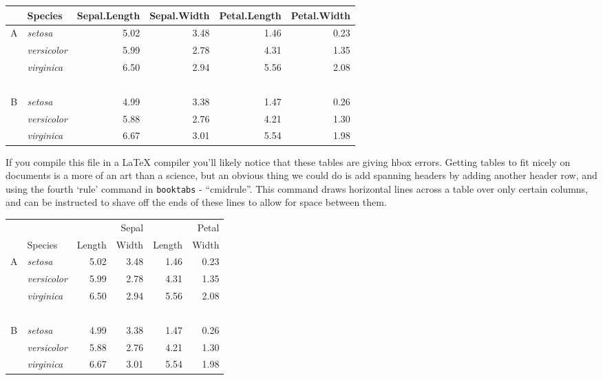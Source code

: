 \documentclass{article}
\begin{document}
\begin{table}[h!]
\centering
\begin{tabular}{clrrrr}
  \toprule
  & Species & Sepal.Length & Sepal.Width & Petal.Length & Petal.Width \\ 
  \midrule
  A & \emph{setosa} & 5.02 & 3.48 & 1.46 & 0.23 \\ 
    & \emph{versicolor} & 5.99 & 2.78 & 4.31 & 1.35 \\ 
    & \emph{virginica} & 6.50 & 2.94 & 5.56 & 2.08 \\ ~\\
  B & \emph{setosa} & 4.99 & 3.38 & 1.47 & 0.26 \\ 
    & \emph{versicolor} & 5.88 & 2.76 & 4.21 & 1.30 \\ 
    & \emph{virginica} & 6.67 & 3.01 & 5.54 & 1.98 \\
   \bottomrule
\end{tabular}
\end{table}

If you compile this file in a LaTeX compiler you'll likely notice that these tables are giving hbox errors. Getting tables to fit nicely on documents is a more of an art than a science, but an obvious thing we could do is add spanning headers by adding another header row, and using the fourth `rule' command in \texttt{booktabs} - ``cmidrule''. This command draws horizontal lines across a table over only certain columns, and can be instructed to shave off the ends of these lines to allow for space between them.

\begin{table}[h!]
\centering
\begin{tabular}{clrrrr}
  \toprule
        &           & \multicolumn{2}{r}{Sepal} & \multicolumn{2}{r}{Petal} \\
        \cmidrule(l){3-4} \cmidrule(l){5-6}
     & Species & Length & Width & Length & Width \\ 
  \midrule
  A & \emph{setosa} & 5.02 & 3.48 & 1.46 & 0.23 \\ 
    & \emph{versicolor} & 5.99 & 2.78 & 4.31 & 1.35 \\ 
    & \emph{virginica} & 6.50 & 2.94 & 5.56 & 2.08 \\ ~\\
  B & \emph{setosa} & 4.99 & 3.38 & 1.47 & 0.26 \\ 
    & \emph{versicolor} & 5.88 & 2.76 & 4.21 & 1.30 \\ 
    & \emph{virginica} & 6.67 & 3.01 & 5.54 & 1.98 \\
   \bottomrule
\end{tabular}
\end{table}
\end{document}
